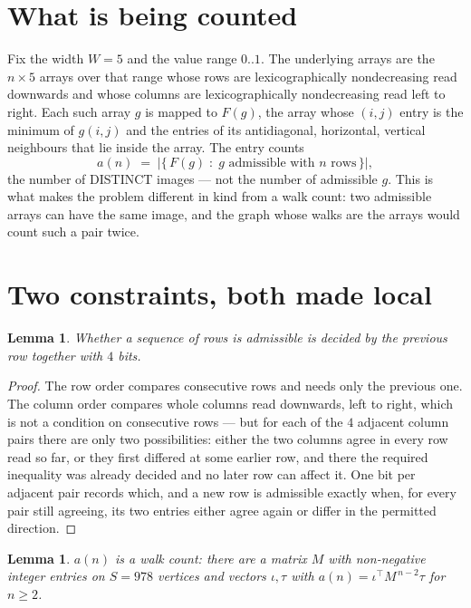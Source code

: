 \documentclass[11pt,a4paper]{article}
\theoremstyle{plain}
\newtheorem{lemma}[theorem]{Lemma}
\theoremstyle{definition}
\begin{document}
\section{What is being counted}

Fix the width $W=5$ and the value range $0..1$. The underlying arrays are the
$n\times5$ arrays over that range whose rows are lexicographically nondecreasing read downwards
and whose columns are lexicographically nondecreasing read left to right. Each such array $g$
is mapped to $F(g)$, the array whose $(i,j)$ entry is the minimum of $g(i,j)$ and the entries
of its antidiagonal, horizontal, vertical neighbours that lie inside the array. The entry counts
\[
a(n)\;=\;\bigl|\{\,F(g)\;:\;g\text{ admissible with }n\text{ rows}\,\}\bigr|,
\]
the number of DISTINCT images --- not the number of admissible $g$. This is what makes the
problem different in kind from a walk count: two admissible arrays can have the same image, and
the graph whose walks are the arrays would count such a pair twice.

\section{Two constraints, both made local}

\begin{lemma}\label{lem:local}
Whether a sequence of rows is admissible is decided by the previous row together with
$4$ bits.
\end{lemma}

\begin{proof}
The row order compares consecutive rows and needs only the previous one. The column order
compares whole columns read downwards, left to right, which is not a condition on consecutive
rows --- but for each of the $4$ adjacent column pairs there are only two possibilities:
either the two columns agree in every row read so far, or they first differed at some earlier
row, and there the required inequality was already decided and no later row can affect it. One
bit per adjacent pair records which, and a new row is admissible exactly when, for every pair
still agreeing, its two entries either agree again or differ in the permitted direction.
\end{proof}

\begin{lemma}\label{lem:det}
$a(n)$ is a walk count: there are a matrix $M$ with non-negative integer entries on $S=978$
vertices and vectors $\iota,\tau$ with $a(n)=\iota^{\!\top}M^{\,n-2}\tau$ for $n\ge2$.
\end{lemma}
\end{document}
